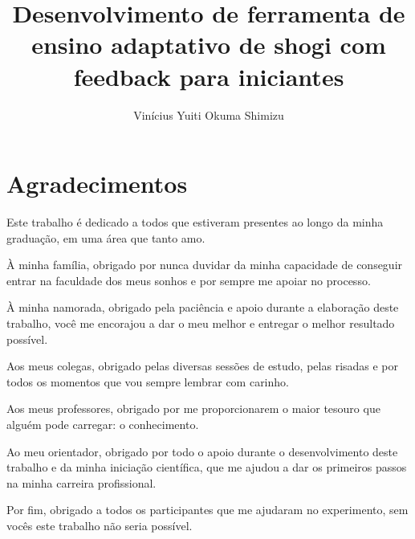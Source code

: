 \documentclass[a4paper,12pt,twoside,english,brazilian]{book}
\title{Desenvolvimento de ferramenta de ensino adaptativo de shogi com feedback para iniciantes}
\author{Vinícius Yuiti Okuma Shimizu}
\begin{document}
\frontmatter

\pagestyle{plain}

\onehalfspacing %

\maketitle

\begin{dedicatoria}

\end{dedicatoria}


\chapter*{Agradecimentos}

Este trabalho é dedicado a todos que estiveram presentes ao longo da minha graduação, em uma área que tanto amo. 

À minha família, obrigado por nunca duvidar da minha capacidade de conseguir entrar na faculdade dos meus sonhos 
e por sempre me apoiar no processo.

À minha namorada, obrigado pela paciência e apoio durante a elaboração deste trabalho, você me encorajou a
dar o meu melhor e entregar o melhor resultado possível.

Aos meus colegas, obrigado pelas diversas sessões de estudo, pelas risadas e por todos os momentos que vou sempre
lembrar com carinho.

Aos meus professores, obrigado por me proporcionarem o maior tesouro que alguém pode carregar: o conhecimento.

Ao meu orientador, obrigado por todo o apoio durante o desenvolvimento deste trabalho e da minha iniciação científica, que
me ajudou a dar os primeiros passos na minha carreira profissional.

Por fim, obrigado a todos os participantes que me ajudaram no experimento, sem vocês este trabalho não seria possível. 



\tableofcontents

\end{document}
